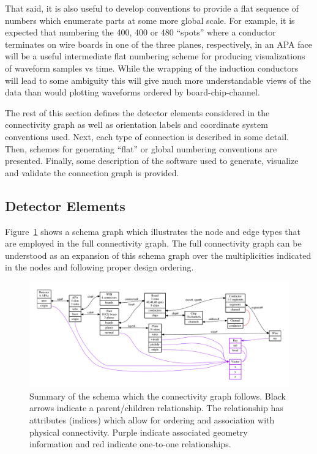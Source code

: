 \documentclass[pdftex,12pt,letter]{article}
\begin{document}
That said, it is also useful to develop conventions to provide a flat
sequence of numbers which enumerate parts at some more global scale.
For example, it is expected that numbering the 400, 400 or 480
``spots'' where a conductor terminates on wire boards in one of the
three planes, respectively, in an APA face will be a useful
intermediate flat numbering scheme for producing visualizations of
waveform samples vs time.  While the wrapping of the induction
conductors will lead to some ambiguity this will give much more
understandable views of the data than would plotting waveforms ordered
by board-chip-channel.

The rest of this section defines the detector elements considered in
the connectivity graph as well as orientation labels and coordinate
system conventions used.  Next, each type of connection is described
in some detail.  Then, schemes for generating ``flat'' or global
numbering conventions are presented.  Finally, some description of the
software used to generate, visualize and validate the connection graph
is provided.


\subsection{Detector Elements}
\label{sec:parts}

Figure~\ref{fig:schema} shows a schema graph which illustrates the
node and edge types that are employed in the full connectivity graph.
The full connectivity graph can be understood as an expansion of this
schema graph over the multiplicities indicated in the nodes and
following proper design ordering.

\begin{figure}[h]
  \centering
  \includegraphics[width=\textwidth]{dots/schema2.pdf}
  \caption[Connectivity schema graph.]{Summary of the schema which the connectivity graph follows.  Black arrows indicate a parent/children relationship.  The relationship has attributes (indices) which allow for ordering and association with physical connectivity.   Purple indicate associated geometry information and red indicate one-to-one relationships. }
  \label{fig:schema}
\end{figure}
\end{document}
